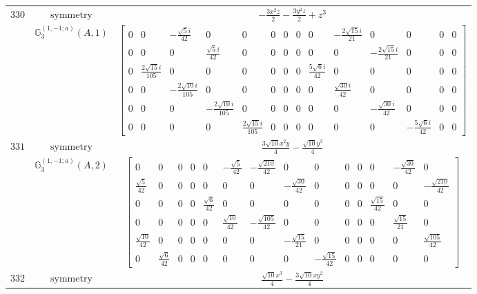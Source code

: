 \documentclass[fleqn,8pt,landscape]{jsarticle}
\begin{document}
\begin{longtable}{ccc}
$ 330 $ & $ \text{symmetry} $ & $ - \frac{3 x^{2} z}{2} - \frac{3 y^{2} z}{2} + z^{3} $ \\
$  $ & $ \mathbb{G}_{3}^{(1,-1;a)}(A,1) $ & $ \begin{bmatrix} 0 & 0 & - \frac{\sqrt{5} i}{42} & 0 & 0 & 0 & 0 & 0 & 0 & - \frac{2 \sqrt{15} i}{21} & 0 & 0 & 0 & 0 \\ 0 & 0 & 0 & \frac{\sqrt{5} i}{42} & 0 & 0 & 0 & 0 & 0 & 0 & - \frac{2 \sqrt{15} i}{21} & 0 & 0 & 0 \\ 0 & \frac{2 \sqrt{15} i}{105} & 0 & 0 & 0 & 0 & 0 & 0 & \frac{5 \sqrt{6} i}{42} & 0 & 0 & 0 & 0 & 0 \\ 0 & 0 & - \frac{2 \sqrt{10} i}{105} & 0 & 0 & 0 & 0 & 0 & 0 & \frac{\sqrt{30} i}{42} & 0 & 0 & 0 & 0 \\ 0 & 0 & 0 & - \frac{2 \sqrt{10} i}{105} & 0 & 0 & 0 & 0 & 0 & 0 & - \frac{\sqrt{30} i}{42} & 0 & 0 & 0 \\ 0 & 0 & 0 & 0 & \frac{2 \sqrt{15} i}{105} & 0 & 0 & 0 & 0 & 0 & 0 & - \frac{5 \sqrt{6} i}{42} & 0 & 0 \end{bmatrix} $ \\ \hline
$ 331 $ & $ \text{symmetry} $ & $ \frac{3 \sqrt{10} x^{2} y}{4} - \frac{\sqrt{10} y^{3}}{4} $ \\
$  $ & $ \mathbb{G}_{3}^{(1,-1;a)}(A,2) $ & $ \begin{bmatrix} 0 & 0 & 0 & 0 & 0 & - \frac{\sqrt{5}}{42} & - \frac{\sqrt{210}}{42} & 0 & 0 & 0 & 0 & 0 & - \frac{\sqrt{30}}{42} & 0 \\ \frac{\sqrt{5}}{42} & 0 & 0 & 0 & 0 & 0 & 0 & - \frac{\sqrt{30}}{42} & 0 & 0 & 0 & 0 & 0 & - \frac{\sqrt{210}}{42} \\ 0 & 0 & 0 & 0 & \frac{\sqrt{6}}{42} & 0 & 0 & 0 & 0 & 0 & 0 & \frac{\sqrt{15}}{42} & 0 & 0 \\ 0 & 0 & 0 & 0 & 0 & \frac{\sqrt{10}}{42} & - \frac{\sqrt{105}}{42} & 0 & 0 & 0 & 0 & 0 & \frac{\sqrt{15}}{21} & 0 \\ \frac{\sqrt{10}}{42} & 0 & 0 & 0 & 0 & 0 & 0 & - \frac{\sqrt{15}}{21} & 0 & 0 & 0 & 0 & 0 & \frac{\sqrt{105}}{42} \\ 0 & \frac{\sqrt{6}}{42} & 0 & 0 & 0 & 0 & 0 & 0 & - \frac{\sqrt{15}}{42} & 0 & 0 & 0 & 0 & 0 \end{bmatrix} $ \\ \hline
$ 332 $ & $ \text{symmetry} $ & $ \frac{\sqrt{10} x^{3}}{4} - \frac{3 \sqrt{10} x y^{2}}{4} $ \\

\end{longtable}
\end{document}

